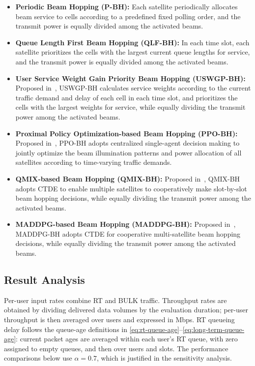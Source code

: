 \documentclass[journal]{IEEEtran}
\begin{document}
\begin{itemize}
    \item \textbf{Periodic Beam Hopping (P-BH):} Each satellite periodically allocates beam service to cells according to a predefined fixed polling order, and the transmit power is equally divided among the activated beams.
        \item \textbf{Queue Length First Beam Hopping (QLF-BH):} In each time slot, each satellite prioritizes the cells with the largest current queue lengths for service, and the transmit power is equally divided among the activated beams.
    \item \textbf{User Service Weight Gain Priority Beam Hopping (USWGP-BH):} Proposed in~\cite{ref14}, USWGP-BH calculates service weights according to the current traffic demand and delay of each cell in each time slot, and prioritizes the cells with the largest weights for service, while equally dividing the transmit power among the activated beams.
        \item \textbf{Proximal Policy Optimization-based Beam Hopping (PPO-BH):} Proposed in~\cite{ref20}, PPO-BH adopts centralized single-agent decision making to jointly optimize the beam illumination patterns and power allocation of all satellites according to time-varying traffic demands.
    \item \textbf{QMIX-based Beam Hopping (QMIX-BH):} Proposed in~\cite{ref21}, QMIX-BH adopts CTDE to enable multiple satellites to cooperatively make slot-by-slot beam hopping decisions, while equally dividing the transmit power among the activated beams.
    \item \textbf{MADDPG-based Beam Hopping (MADDPG-BH):} Proposed in~\cite{ref23}, MADDPG-BH adopts CTDE for cooperative multi-satellite beam hopping decisions, while equally dividing the transmit power among the activated beams.

\end{itemize}

\subsection{Result Analysis}
\label{subsec:result-analysis}
Per-user input rates combine RT and BULK traffic. Throughput rates are obtained by dividing delivered data volumes by the evaluation duration; per-user throughput is then averaged over users and expressed in Mbps. RT queueing delay follows the queue-age definitions in \eqref{eq:rt-queue-age}--\eqref{eq:long-term-queue-age}: current packet ages are averaged within each user's RT queue, with zero assigned to empty queues, and then over users and slots. The performance comparisons below use $\alpha=0.7$, which is justified in the sensitivity analysis.
\end{document}
